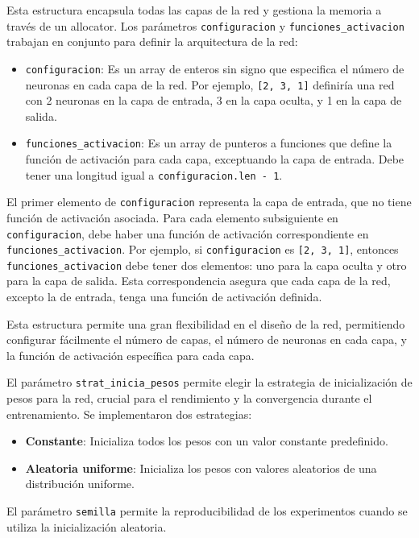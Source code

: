 \documentclass[twocolumn]{article}
\begin{document}
Esta estructura encapsula todas las capas de la red y gestiona la memoria a través de un allocator. Los parámetros \texttt{configuracion} y \texttt{funciones\_activacion} trabajan en conjunto para definir la arquitectura de la red:

\begin{itemize}
    \item \texttt{configuracion}: Es un array de enteros sin signo que especifica el número de neuronas en cada capa de la red. Por ejemplo, \texttt{[2, 3, 1]} definiría una red con 2 neuronas en la capa de entrada, 3 en la capa oculta, y 1 en la capa de salida.

    \item \texttt{funciones\_activacion}: Es un array de punteros a funciones que define la función de activación para cada capa, exceptuando la capa de entrada. Debe tener una longitud igual a \texttt{configuracion.len - 1}.
\end{itemize}

El primer elemento de \texttt{configuracion} representa la capa de entrada, que no tiene función de activación asociada. Para cada elemento subsiguiente en \texttt{configuracion}, debe haber una función de activación correspondiente en \texttt{funciones\_activacion}. Por ejemplo, si \texttt{configuracion} es \texttt{[2, 3, 1]}, entonces \texttt{funciones\_activacion} debe tener dos elementos: uno para la capa oculta y otro para la capa de salida. Esta correspondencia asegura que cada capa de la red, excepto la de entrada, tenga una función de activación definida.

Esta estructura permite una gran flexibilidad en el diseño de la red, permitiendo configurar fácilmente el número de capas, el número de neuronas en cada capa, y la función de activación específica para cada capa.

El parámetro \texttt{strat\_inicia\_pesos} permite elegir la estrategia de inicialización de pesos para la red, crucial para el rendimiento y la convergencia durante el entrenamiento. Se implementaron dos estrategias:

\begin{itemize}
    \item \textbf{Constante}: Inicializa todos los pesos con un valor constante predefinido.
    \item \textbf{Aleatoria uniforme}: Inicializa los pesos con valores aleatorios de una distribución uniforme.
\end{itemize}
El parámetro \texttt{semilla} permite la reproducibilidad de los experimentos cuando se utiliza la inicialización aleatoria.
\end{document}
